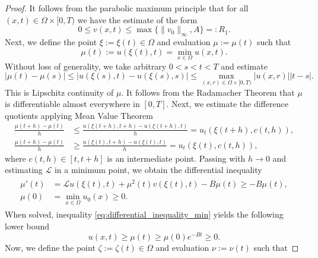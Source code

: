 \documentclass[12pt, a4paper]{article}
\theoremstyle{break}
\theoremstyle{break}
\theoremstyle{break}
\theoremstyle{break}
\theoremstyle{break}
\theoremstyle{break}
\theoremstyle{break}
\begin{document}
\begin{proof}
    It follows from the parabolic maximum principle that for all $(x, t) \in \Omega \times [0, T)$ we have the estimate of the form
    \begin{equation}
        \label{EQ:AprioriEstimate_V}
        0 \leq v(x, t) \leq \max\{\|v_0\|_\infty, A\} =: R_1.
    \end{equation}
    Next, we define the point $\xi := \xi(t) \in \Omega$ and evaluation $\mu := \mu(t)$ such that 
    \begin{equation*}
        \mu(t) := u(\xi(t), t) = \min_{x \in \Omega} u(x, t).
    \end{equation*}
    Without loss of generality, we take arbitrary $0 < s < t < T$ and estimate
    \begin{equation*}
        \left|\mu(t) - \mu(s)\right| \leq \left|u(\xi(s), t) - u(\xi(s), s)\right| \leq \max_{(x, r) \in \Omega \times [0, T)} |u(x, r)| |t-s|.
    \end{equation*}
    This is Lipschitz continuity of $\mu$. It follows from the Radamacher Theorem that $\mu$ is differentiable almost everywhere in $[0, T]$. Next, we estimate the difference quotients applying Mean Value Theorem
    \begin{align*}
        \frac{\mu(t+h) - \mu(t)}{h} &\leq \frac{u(\xi(t+h), t+h) - u(\xi(t + h), t)}{h} = u_t(\xi(t + h), c(t, h)), \\
        \frac{\mu(t+h) - \mu(t)}{h} &\geq \frac{u(\xi(t), t+h) - u(\xi(t), t)}{h} = u_t(\xi(t), c(t, h)),
    \end{align*}
    where $c(t,h) \in [t, t+h]$ is an intermediate point. Passing with $h \rightarrow 0$ and estimating $\mathcal{L}$ in a minimum point, we obtain the differential inequality
    \begin{align}
        \label{eq:differential_inequality_min}
        \begin{split}
            \mu'(t) &= \mathcal{L} u(\xi(t), t) + \mu^2(t) v(\xi(t), t) - B \mu(t) \geq - B \mu(t), \\
            \mu(0) &= \min_{x \in \Omega} u_0(x) \geq 0.
        \end{split}
    \end{align}
    When solved, inequality \eqref{eq:differential_inequality_min} yields the following lower bound 
    \begin{equation*}
        u(x,t) \geq \mu(t) \geq \mu(0) e^{-B t} \geq 0.
    \end{equation*}
    Now, we define the point $\zeta := \zeta(t) \in \Omega$ and evaluation $\nu := \nu(t)$ such that

\end{proof}
\end{document}
